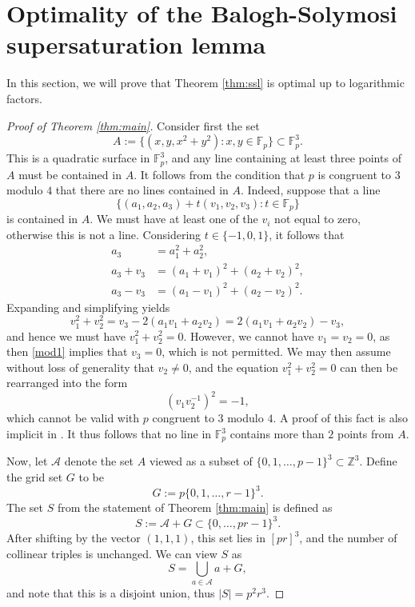 \documentclass[11pt]{amsart}
\theoremstyle{remark}
\begin{document}
\section{Optimality of the Balogh-Solymosi supersaturation lemma} \label{sec:optimal}


In this section, we will prove that Theorem \ref{thm:ssl} is optimal up to logarithmic factors.




 \begin{proof}[Proof of Theorem \ref{thm:main}]
 
 


Consider first the set
\[
A:= \{ (x,y,x^2+y^2) :x,y \in \mathbb F_p \} \subset \mathbb F_p^3.
\]
This is a quadratic surface in $\mathbb F_p^3$, and any line containing at least three points of $A$ must be contained in $A$. It follows from the condition that $p$ is congruent to $3$ modulo $4$ that there are no lines contained in $A$. Indeed, suppose that a line
\[
\{(a_1,a_2,a_3)+t(v_1,v_2,v_3) : t \in \mathbb F_p \}
\]
is contained in $A$. We must have at least one of the $v_i$ not equal to zero, otherwise this is not a line. Considering $t \in \{-1,0,1\}$, it follows that
\begin{align*}
    a_3 & = a_1^2+a_2^2,
    \\ a_3 +v_3 &=(a_1+v_1)^2+(a_2+v_2)^2,
    \\ a_3-v_3 &= (a_1-v_1)^2+(a_2-v_2)^2.
\end{align*}
Expanding and simplifying yields
\begin{equation} \label{mod1}
v_1^2+v_2^2=v_3-2(a_1v_1+a_2v_2) = 2(a_1v_1+a_2v_2)-v_3,
\end{equation}
and hence we must have $v_1^2+v_2^2=0$. However, we cannot have $v_1=v_2=0$, as then \eqref{mod1} implies that $v_3=0$, which is not permitted. We may then assume without loss of generality that $v_2 \neq 0$, and the equation $v_1^2+v_2^2=0$ can then be rearranged into the form
\[
(v_1v_2^{-1})^2=-1,
\]
which cannot be valid with $p$ congruent to $3$ modulo $4$. A proof of this fact is also implicit in \cite[Lemma 5]{PoWo}. It thus follows that no line in $\mathbb F_p^3$ contains more than $2$ points from $A$. 

Now, let $\mathcal A$ denote the set $A$ viewed as a subset of $ \{0,1,\dots,p-1 \}^3 \subset \mathbb Z^3$. Define the grid set $G$ to be
\[
G:=  p\{0,1, \dots, r-1\}^3.
\]
The set $S$ from the statement of Theorem \ref{thm:main} is defined as
\[
S:= \mathcal A + G \subset \{0,\dots,pr-1 \}^3.
\]
After shifting by the vector $(1,1,1)$, this set lies in $[pr]^3$, and the number of collinear triples is unchanged. We can view $S$ as 
\[
S= \bigcup_{a \in \mathcal A} a + G,
\]
and note that this is a disjoint union, thus $|S|=p^2r^3$.


\end{proof}
\end{document}

